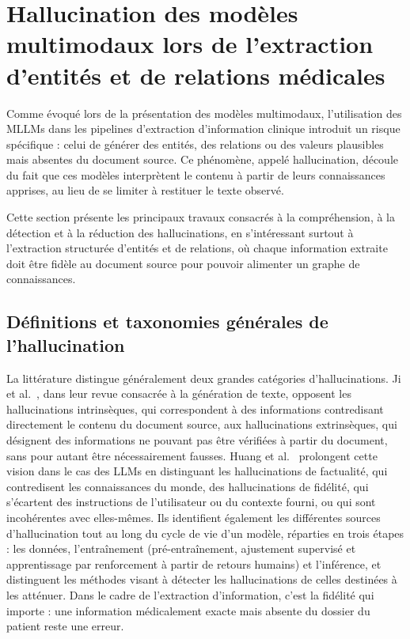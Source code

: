 \section{Hallucination des modèles multimodaux lors de l'extraction d'entités et de relations médicales}

Comme évoqué lors de la présentation des modèles multimodaux, l'utilisation des MLLMs dans les pipelines d'extraction d'information clinique introduit un risque spécifique : celui de générer des entités, des relations ou des valeurs plausibles mais absentes du document source. Ce phénomène, appelé hallucination, découle du fait que ces modèles interprètent le contenu à partir de leurs connaissances apprises, au lieu de se limiter à restituer le texte observé.

Cette section présente les principaux travaux consacrés à la compréhension, à la détection et à la réduction des hallucinations, en s'intéressant surtout à l'extraction structurée d'entités et de relations, où chaque information extraite doit être fidèle au document source pour pouvoir alimenter un graphe de connaissances.

\subsection{Définitions et taxonomies générales de l'hallucination}

La littérature distingue généralement deux grandes catégories d'hallucinations. Ji et al.~\cite{ji2023survey}, dans leur revue consacrée à la génération de texte, opposent les hallucinations intrinsèques, qui correspondent à des informations contredisant directement le contenu du document source, aux hallucinations extrinsèques, qui désignent des informations ne pouvant pas être vérifiées à partir du document, sans pour autant être nécessairement fausses. Huang et al.~\cite{huang2023survey} prolongent cette vision dans le cas des LLMs en distinguant les hallucinations de factualité, qui contredisent les connaissances du monde, des hallucinations de fidélité, qui s'écartent des instructions de l'utilisateur ou du contexte fourni, ou qui sont incohérentes avec elles-mêmes. Ils identifient également les différentes sources d'hallucination tout au long du cycle de vie d'un modèle, réparties en trois étapes : les données, l'entraînement (pré-entraînement, ajustement supervisé et apprentissage par renforcement à partir de retours humains) et l'inférence, et distinguent les méthodes visant à détecter les hallucinations de celles destinées à les atténuer. Dans le cadre de l'extraction d'information, c'est la fidélité qui importe : une information médicalement exacte mais absente du dossier du patient reste une erreur.

